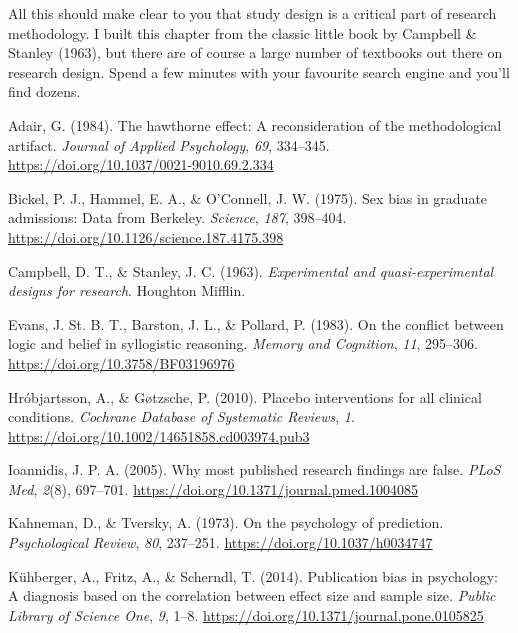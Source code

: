 \documentclass[
  a4paper,
]{book}
\newlength{\cslhangindent}
\newenvironment{CSLReferences}[2] %
 {\begin{list}{}{%
  \setlength{\itemindent}{0pt}
  \setlength{\leftmargin}{0pt}
  \setlength{\parsep}{0pt}
  \ifodd #1
   \setlength{\leftmargin}{\cslhangindent}
   \setlength{\itemindent}{-1\cslhangindent}
  \fi
  \setlength{\itemsep}{#2\baselineskip}}}
 {\end{list}}
\begin{document}
All this should make clear to you that study design is a critical part
of research methodology. I built this chapter from the classic little
book by Campbell \& Stanley (1963), but there are of course a large
number of textbooks out there on research design. Spend a few minutes
with your favourite search engine and you'll find dozens.

\label{refs}
\begin{CSLReferences}{1}{0}
Adair, G. (1984). The hawthorne effect: A reconsideration of the
methodological artifact. \emph{Journal of Applied Psychology},
\emph{69}, 334--345. \url{https://doi.org/10.1037/0021-9010.69.2.334}

Bickel, P. J., Hammel, E. A., \& O'Connell, J. W. (1975). Sex bias in
graduate admissions: Data from {B}erkeley. \emph{Science}, \emph{187},
398--404. \url{https://doi.org/10.1126/science.187.4175.398}

Campbell, D. T., \& Stanley, J. C. (1963). \emph{Experimental and
quasi-experimental designs for research}. Houghton Mifflin.

Evans, J. St. B. T., Barston, J. L., \& Pollard, P. (1983). On the
conflict between logic and belief in syllogistic reasoning. \emph{Memory
and Cognition}, \emph{11}, 295--306.
\url{https://doi.org/10.3758/BF03196976}

Hróbjartsson, A., \& Gøtzsche, P. (2010). Placebo interventions for all
clinical conditions. \emph{Cochrane Database of Systematic Reviews},
\emph{1}. \url{https://doi.org/10.1002/14651858.cd003974.pub3}

Ioannidis, J. P. A. (2005). Why most published research findings are
false. \emph{PLoS Med}, \emph{2}(8), 697--701.
\url{https://doi.org/10.1371/journal.pmed.1004085}

Kahneman, D., \& Tversky, A. (1973). On the psychology of prediction.
\emph{Psychological Review}, \emph{80}, 237--251.
\url{https://doi.org/10.1037/h0034747}

Kühberger, A., Fritz, A., \& Scherndl, T. (2014). Publication bias in
psychology: A diagnosis based on the correlation between effect size and
sample size. \emph{Public Library of Science One}, \emph{9}, 1--8.
\url{https://doi.org/10.1371/journal.pone.0105825}


\end{CSLReferences}
\end{document}
